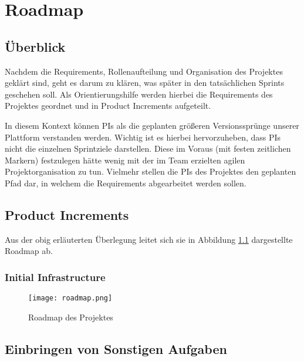 
\chapter{Roadmap}

\section{Überblick}
Nachdem die Requirements, Rollenaufteilung und Organisation des Projektes geklärt sind, geht es darum zu klären, was später in den tatsächlichen Sprints geschehen soll.
Als Orientierungshilfe werden hierbei die Requirements des Projektes geordnet und in Product Increments aufgeteilt.

In diesem Kontext können \ac{PI}s als die geplanten größeren Versionssprünge unserer Plattform verstanden werden.
Wichtig ist es hierbei hervorzuheben, dass \ac{PI}s nicht die einzelnen Sprintziele darstellen.
Diese im Voraus (mit festen zeitlichen Markern) festzulegen hätte wenig mit der im Team erzielten agilen Projektorganisation zu tun.
Vielmehr stellen die \ac{PI}s des Projektes den geplanten Pfad dar, in welchem die Requirements abgearbeitet werden sollen.

\section{Product Increments}
Aus der obig erläuterten Überlegung leitet sich sie in Abbildung \ref{fig:roadmap} dargestellte Roadmap ab.

\subsection{Initial Infrastructure}

\begin{figure}
    \centering
    \texttt{[image: roadmap.png]}
    \caption{Roadmap des Projektes}
    \label{fig:roadmap}
\end{figure}



\section{Einbringen von Sonstigen Aufgaben}

